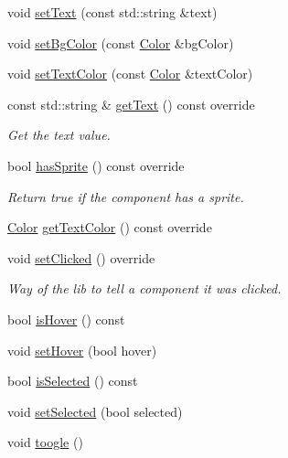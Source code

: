 \begin{DoxyCompactItemize}
void \hyperlink{classarcade_1_1_u_i_component_abf7a2ca878ba0963e2c3ac17207f0622}{set\+Text} (const std\+::string \&text)
\item 
void \hyperlink{classarcade_1_1_u_i_component_a9adbc1ec26ce4d5e707b975026f4e499}{set\+Bg\+Color} (const \hyperlink{unionarcade_1_1_color}{Color} \&bg\+Color)
\item 
void \hyperlink{classarcade_1_1_u_i_component_abaab3b3d90da61e7a579b57f2cf3c35e}{set\+Text\+Color} (const \hyperlink{unionarcade_1_1_color}{Color} \&text\+Color)
\item 
const std\+::string \& \hyperlink{classarcade_1_1_u_i_component_aa930897f9456ed9462063481d19d10ed}{get\+Text} () const override
\begin{DoxyCompactList}\small\item\em Get the text value. \end{DoxyCompactList}\item 
bool \hyperlink{classarcade_1_1_u_i_component_a0f41ff1be1ae457a3be0856553e904f4}{has\+Sprite} () const override
\begin{DoxyCompactList}\small\item\em Return true if the component has a sprite. \end{DoxyCompactList}\item 
\hyperlink{unionarcade_1_1_color}{Color} \hyperlink{classarcade_1_1_u_i_component_a0a9e2a34357ad6759d580e152a20adee}{get\+Text\+Color} () const override
\item 
void \hyperlink{classarcade_1_1_u_i_component_a8d87597d38fbc7cd93835d5712e3915c}{set\+Clicked} () override
\begin{DoxyCompactList}\small\item\em Way of the lib to tell a component it was clicked. \end{DoxyCompactList}\item 
bool \hyperlink{classarcade_1_1_u_i_component_a3ee6eaf72f0622ac5e49c285b48d73a6}{is\+Hover} () const
\item 
void \hyperlink{classarcade_1_1_u_i_component_a08ab8e887fe7f5337ac0e87a82105e37}{set\+Hover} (bool hover)
\item 
bool \hyperlink{classarcade_1_1_u_i_component_ad1ee9ac6cbe4dfd28e399317c5d38e8c}{is\+Selected} () const
\item 
void \hyperlink{classarcade_1_1_u_i_component_aa09f60dbf12dcb42e15b7a23ae61bf74}{set\+Selected} (bool selected)
\item 
void \hyperlink{classarcade_1_1_u_i_component_a055dcadcb7799e09fa9aa29c9e1b8f48}{toogle} ()
\end{DoxyCompactItemize}


